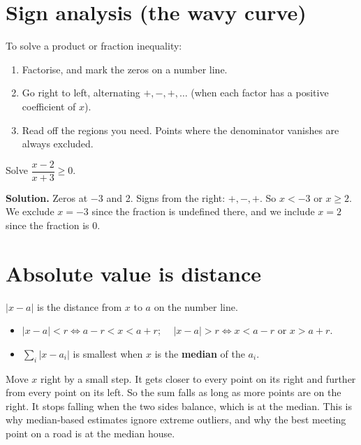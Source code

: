 \documentclass[11pt,a4paper,openany]{report}
\begin{document}
\section{Sign analysis (the wavy curve)}
To solve a product or fraction inequality:
\begin{enumerate}[nosep]
\item Factorise, and mark the zeros on a number line.
\item Go right to left, alternating $+,-,+,\dots$ (when each factor has a positive coefficient of $x$).
\item Read off the regions you need. Points where the denominator vanishes are always excluded.
\end{enumerate}
\begin{center}
\end{center}

\begin{example}
Solve $\dfrac{x-2}{x+3}\ge0$.

\textbf{Solution.} Zeros at $-3$ and 2. Signs from the right: $+,-,+$. So $x<-3$ or $x\ge2$. We exclude $x=-3$ since the fraction is undefined there, and we include $x=2$ since the fraction is 0.
\end{example}

\section{Absolute value is distance}
$|x-a|$ is the distance from $x$ to $a$ on the number line.
\begin{itemize}[nosep]
\item $|x-a|<r\iff a-r<x<a+r$; $\quad|x-a|>r\iff x<a-r$ or $x>a+r$.
\item $\sum_i|x-a_i|$ is smallest when $x$ is the \textbf{median} of the $a_i$.
\end{itemize}
\begin{why}
Move $x$ right by a small step. It gets closer to every point on its right and further from every point on its left. So the sum falls as long as more points are on the right. It stops falling when the two sides balance, which is at the median. This is why median-based estimates ignore extreme outliers, and why the best meeting point on a road is at the median house.
\end{why}
\end{document}

